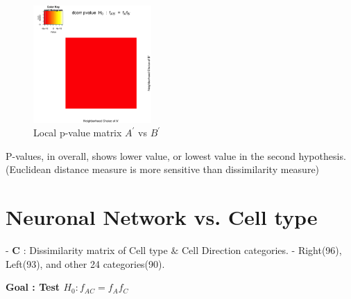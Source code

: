 \documentclass[12pt]{report}
\begin{document}
\begin{figure}[H]
\captionsetup{format=plain}
\centering
\includegraphics[width=0.4\textwidth]{../figure/P_A2_E.png}
\caption{Local p-value matrix $A^\prime$ vs $B^\prime$}
\label{fig:PA2E}
\end{figure} 


P-values, in overall, shows lower value, or lowest value in the second hypothesis. (Euclidean distance measure is more sensitive than dissimilarity measure)

\newpage
\section{Neuronal Network vs. Cell type}
 
 
- \textbf{C} : Dissimilarity matrix of Cell type $\&$ Cell Direction categories. - Right(96), Left(93), and other 24 categories(90).  
 
\begin{center}\textbf{Goal : Test $H_{0} : f_{AC} = f_{A}f_{C}$}
\end{center}  
 
\end{document}
